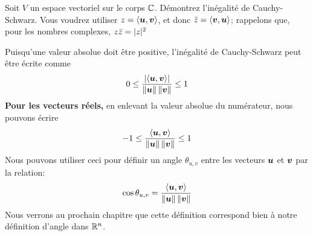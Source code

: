 %
%
\begin{exerciceB}
Soit $V$ un espace vectoriel sur le corps $\mathbb{C}$. Démontrez l'inégalité de Cauchy-Schwarz.
Vous voudrez utiliser  $z = \langle\boldsymbol{u}, \boldsymbol{v}\rangle$, et donc $\bar{z} =  \langle\boldsymbol{v}, \boldsymbol{u}\rangle$; 
rappelons que, pour les nombres complexes, $z\bar{z} = \lvert z\rvert^2$
\end{exerciceB}
%
Puisqu'une valeur absolue doit être positive, l'inégalité de Cauchy-Schwarz peut être écrite comme
\[
0 \leq \frac{ \lvert\langle\boldsymbol{u}, \boldsymbol{v}\rangle\rvert }{ \lVert\boldsymbol{u}\rVert \, \lVert\boldsymbol{v}\rVert} \leq 1
\]
\textbf{Pour les vecteurs réels,} en enlevant la valeur absolue du numérateur, nous pouvons écrire
\[
-1 \leq \frac{ \langle\boldsymbol{u}, \boldsymbol{v}\rangle} { \lVert\boldsymbol{u}\rVert \, \lVert\boldsymbol{v}\rVert} \leq 1
\]
Nous pouvons utiliser ceci pour définir un angle $\theta_{u, v}$ entre les vecteurs $\boldsymbol{u}$ et $\boldsymbol{v}$ par la relation:
\begin{equation}
\cos\theta_{u, v} =   \frac{ \langle\boldsymbol{u}, \boldsymbol{v}\rangle} { \lVert\boldsymbol{u}\rVert \, \lVert\boldsymbol{v}\rVert} \label{eq:cos}
\end{equation}
Nous verrons au prochain chapitre que cette définition correspond bien à notre définition d'angle dans $\mathbb{R}^n$.

